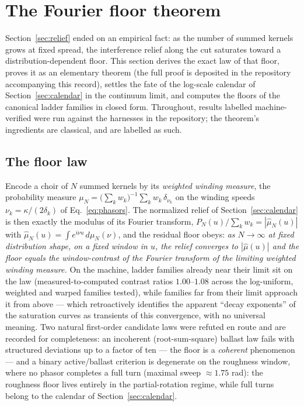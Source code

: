 \documentclass[11pt,a4paper]{article}
\begin{document}
\section{The Fourier floor theorem}
\label{sec:floor}

Section~\ref{sec:relief} ended on an empirical fact: as the number of
summed kernels grows at fixed spread, the interference relief along the
cut saturates toward a distribution-dependent floor. This section derives
the exact law of that floor, proves it as an elementary theorem (the full
proof is deposited in the repository accompanying this record), settles
the fate of the log-scale calendar of Section~\ref{sec:calendar} in the
continuum limit, and computes the floors of the canonical ladder families
in closed form. Throughout, results labelled machine-verified were run
against the harnesses in the repository; the theorem's ingredients are
classical, and are labelled as such.

\subsection{The floor law}
\label{sec:floorlaw}

Encode a choir of $N$ summed kernels by its \emph{weighted winding
measure}, the probability measure
$\mu_N = \bigl(\sum_k w_k\bigr)^{-1} \sum_k w_k\, \delta_{\nu_k}$ on the
winding speeds $\nu_k = \kappa/(2\delta_k)$ of
Eq.~\eqref{eq:phasors}. The normalized relief of
Section~\ref{sec:calendar} is then exactly the modulus of its Fourier
transform, $P_N(u)/\sum_k w_k = |\hat{\mu}_N(u)|$ with
$\hat{\mu}_N(u) = \int e^{i\nu u}\, d\mu_N(\nu)$, and the residual floor
obeys:
\emph{as $N \to \infty$ at fixed distribution shape, on a fixed window in
$u$, the relief converges to $|\hat{\mu}(u)|$ and the floor equals the
window-contrast of the Fourier transform of the limiting weighted winding
measure.} On the machine, ladder families already near their limit sit on
the law (measured-to-computed contrast ratios $1.00$--$1.08$ across the
log-uniform, weighted and warped families tested), while families far
from their limit approach it from above --- which retroactively
identifies the apparent ``decay exponents'' of the saturation curves as
transients of this convergence, with no universal meaning. Two natural
first-order candidate laws were refuted en route and are recorded for
completeness: an incoherent (root-sum-square) ballast law fails with
structured deviations up to a factor of ten --- the floor is a
\emph{coherent} phenomenon --- and a binary active/ballast criterion is
degenerate on the roughness window, where no phasor completes a full
turn (maximal sweep $\approx 1.75$ rad): the roughness floor lives
entirely in the partial-rotation regime, while full turns belong to the
calendar of Section~\ref{sec:calendar}.
\end{document}
